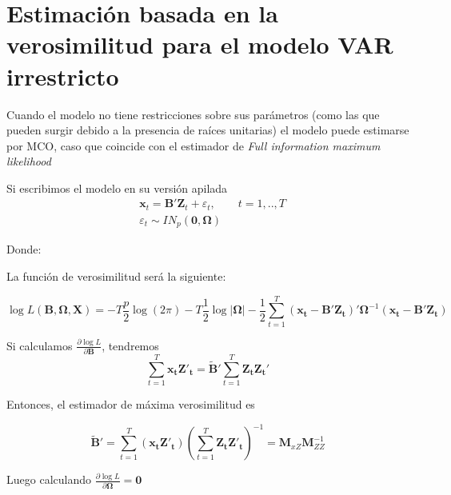 \documentclass[12pt, twoside]{book}\usepackage[]{graphicx}\usepackage[]{color}
\let\bold\boldsymbol
\numberwithin{equation}{section}
\numberwithin{theorem}{section}
\numberwithin{teorema}{section}
\numberwithin{defi}{section}
\numberwithin{prop}{section}
\numberwithin{defi}{section}
\theoremstyle{plain}
\begin{document}
{\section{Estimación basada en la verosimilitud para el modelo VAR irrestricto}

Cuando el modelo no tiene restricciones sobre sus parámetros (como las que pueden surgir debido a la presencia de raíces unitarias) el modelo puede estimarse por MCO, caso que coincide con el estimador de \textit{Full information maximum likelihood}

Si escribimos el modelo en su versión apilada
\begin{align}
& \bold{x}_{t} = \bold{B'Z}_{t}+\varepsilon_{t}, \qquad t=1,..,T \\ 
& \varepsilon_{t}\sim IN_{p}(\bold{0,\Omega})
\end{align}

Donde: 

La función de verosimilitud será la siguiente: 

\begin{equation}
\log L(\boldsymbol{B,\Omega,X}) = -T\frac{p}{2}\log(2\pi)-T\frac{1}{2}\log|\bold{\Omega}|-\frac{1}{2}\sum_{t=1}^{T}(\bold{x_{t}-B'Z_{t}})'\boldsymbol{\Omega}^{-1}(\bold{x_{t}-B'Z_{t}})
\end{equation}

Si calculamos $\frac{\partial \log L}{\partial \bold{B}}$, tendremos
\begin{equation*}
\sum_{t=1}^{T}\bold{x_{t}Z'_{t}} = \bold{\tilde{B}'}\sum_{t=1}^{T}\bold{Z_{t}Z_{t}'}
\end{equation*}

Entonces, el estimador de máxima verosimilitud es 

\begin{equation}
\bold{\tilde{B}}' = \sum_{t=1}^{T}(\bold{x_{t}Z'_{t}})\left(\sum_{t=1}^{T}\bold{Z_{t}Z'_{t}}\right)^{-1} = \bold{M}_{xZ}\bold{M}_{ZZ}^{-1}
\end{equation}

Luego calculando $=\bold{0}$

}
\end{document}
